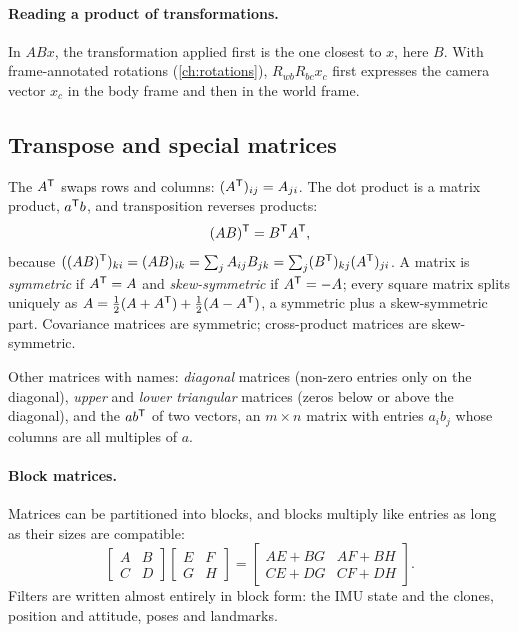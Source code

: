 \paragraph{Reading a product of transformations.} In $ABx$, the transformation applied first is the one closest to
$x$, here $B$. With frame-annotated rotations (\cref{ch:rotations}), $R_{wb}R_{bc}x_c$ first expresses the camera
vector $x_c$ in the body frame and then in the world frame.

\subsection{Transpose and special matrices}

The  $A^{\mathsf{T}}$ swaps rows and columns: $(A^{\mathsf{T}})_{ij} = A_{ji}$. The dot product is a matrix product,
$a^{\mathsf{T}} b$, and transposition reverses products:
\begin{equation}
  (AB)^{\mathsf{T}} = B^{\mathsf{T}} A^{\mathsf{T}},
\end{equation}
because $((AB)^{\mathsf{T}})_{ki} = (AB)_{ik} = \sum_jA_{ij}B_{jk} = \sum_j(B^{\mathsf{T}})_{kj}(A^{\mathsf{T}})_{ji}$. A matrix is \emph{symmetric} if
$A^{\mathsf{T}} = A$ and \emph{skew-symmetric} if $A^{\mathsf{T}} = -A$; every square matrix splits uniquely as
$A = \tfrac12(A + A^{\mathsf{T}}) + \tfrac12(A - A^{\mathsf{T}})$, a symmetric plus a skew-symmetric part. Covariance matrices are symmetric;
cross-product matrices are skew-symmetric.

Other matrices with names: \emph{diagonal} matrices (non-zero entries only on the diagonal), \emph{upper} and
\emph{lower triangular} matrices (zeros below or above the diagonal), and the  $ab^{\mathsf{T}}$ of two
vectors, an $m\times n$ matrix with entries $a_ib_j$ whose columns are all multiples of $a$.

\paragraph{Block matrices.} Matrices can be partitioned into blocks, and blocks multiply like entries as long as
their sizes are compatible:
\begin{equation}
  \begin{bmatrix} A & B \\ C & D \end{bmatrix}\begin{bmatrix} E & F \\ G & H \end{bmatrix}
  = \begin{bmatrix} AE + BG & AF + BH \\ CE + DG & CF + DH \end{bmatrix}.
\end{equation}
Filters are written almost entirely in block form: the IMU state and the clones, position and attitude, poses and
landmarks.

